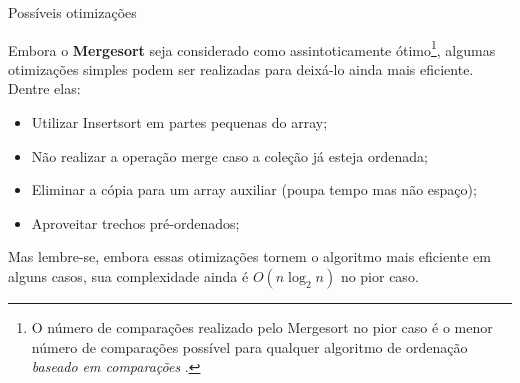 \documentclass{beamer}
\begin{document}
	\begin{frame}[c]{Possíveis otimizações}

		Embora o \textbf{Mergesort} seja considerado como assintoticamente ótimo\footnote[frame]{O número de comparações realizado pelo Mergesort no pior caso é o menor número de comparações possível para qualquer algoritmo de ordenação \textit{baseado em comparações} \cite{sedgewick2014algorithms}.}, algumas otimizações simples podem ser realizadas para deixá-lo ainda mais eficiente. Dentre elas:

		\begin{itemize}
				\item Utilizar Insertsort em partes pequenas do array;
				\item Não realizar a operação merge caso a coleção já esteja ordenada;
				\item Eliminar a cópia para um array auxiliar (poupa tempo mas não espaço);
				\item Aproveitar trechos pré-ordenados;
		\end{itemize}

		Mas lembre-se, embora essas otimizações tornem o algoritmo mais eficiente em alguns casos, sua complexidade ainda é $O(n \log_{2}{n})$ no pior caso.


	\end{frame}
\end{document}
